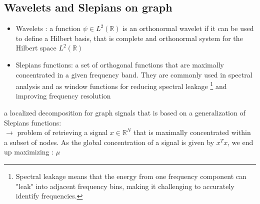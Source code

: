 \documentclass[12pt]{article}
\newcommand{\RR}{\mathbb{R}} %
\begin{document}
\subsection{Wavelets and Slepians on graph}
    \begin{itemize}
        \item Wavelets : a function $\psi\in L^2(\RR)$ is an orthonormal wavelet if it can be used to define a Hilbert basis, that is complete and orthonormal system for the Hilbert space $L^2(\RR)$
        \item Slepians functions:  a set of orthogonal functions that are maximally concentrated in a given frequency band. They are commonly used in spectral analysis and as window functions for reducing spectral leakage \footnote{Spectral leakage means that the energy from one frequency component can "leak" into adjacent frequency bins, making it challenging to accurately identify frequencies.} and improving frequency resolution
    \end{itemize}
    a localized decomposition for graph signals that is based on a generalization of Slepians functions: \\
    $\rightarrow$ problem of retrieving a signal $x\in\RR^N$ that is maximally concentrated within a subset of nodes. As the global concentration of a signal is given by $x^Tx$, we end up maximizing : $\mu$
\end{document}
